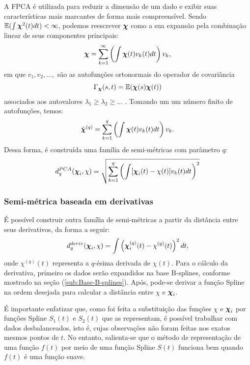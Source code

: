 \documentclass[
	12pt,				%
	openright,			%
	oneside,			%
	a4paper,			%
	english,			%
	brazil				%
	]{dissertacao-ufrgs-abntex2}
\begin{document}
A FPCA é utilizada para reduzir a dimensão de um dado e exibir suas
características mais marcantes de forma mais compreensível. Sendo
$\mathbb{E}(\int\boldsymbol{\chi}^{2}(t)dt)<\infty$, podemos reescrever $\boldsymbol{\chi}$
como a sua expansão pela combinação linear de seus componentes principais:
\begin{equation}
\boldsymbol{\chi}=\sum_{k=1}^{\text{\ensuremath{\infty}}}\left(\int\boldsymbol{\chi}(t)v_{k}(t)dt\right)v_{k},
\end{equation}
em que $v_{1},v_{2},...,$ são as autofunções ortonormais do operador de covariância
\begin{equation}
\Gamma_{\boldsymbol{\chi}}(s,t)=\mathbb{E}(\boldsymbol{\chi}(s)\boldsymbol{\chi}(t))
\end{equation}
associados aos autovalores $\lambda_{1}\geq\lambda_{2}\geq...$ .
Tomando um um número finito de autofunções, temos:
\begin{equation}
\tilde{\boldsymbol{\chi}}^{(q)}=\sum_{k=1}^{\text{\ensuremath{q}}}\left(\int\boldsymbol{\chi}(t)v_{k}(t)dt\right)v_{k}.
\end{equation}
Dessa forma, é construída uma família de semi-métricas com parâmetro
$q$:
\begin{equation}
d_{q}^{PCA}(\boldsymbol{\chi}_{i},\chi)=\sqrt{\sum_{k=1}^{\text{\ensuremath{q}}}\left(\int[\boldsymbol{\chi}_{i}(t)-\chi(t)]v_{k}(t)dt\right)^{2}}
\end{equation}



\subsubsection{Semi-métrica baseada em derivativas}

É possível construir outra família de semi-métricas a partir da distância
entre seus derivativos, da forma a seguir:
\begin{equation}
d_{q}^{deriv}(\boldsymbol{\chi}_{i},\chi)=\int\left(\boldsymbol{\chi}_{i}^{(q)}(t)-\chi^{(q)}(t)\right)^{2}dt,
\end{equation}
onde $\chi^{(q)}(t)$ representa a $q$-ésima derivada de $\chi(t)$.
Para o cálculo da derivativa, primeiro os dados serão expandidos na
base B-splines, conforme mostrado na seção (\ref{sub:Base-B-splines}).
Após, pode-se derivar a função Spline na ordem desejada para calcular
a distância entre $\chi$ e $\boldsymbol{\chi}_{i}$.

É importante enfatizar que, como foi feita a substituição das funções
$\chi$ e $\boldsymbol{\chi}_{i}$ por funções Spline $S_{1}(t)$ e $S_{2}(t)$
que as representam, é possível trabalhar com dados desbalanceados,
isto é, cujas observações não foram feitas nos exatos mesmos pontos
de $t$. No entanto, salienta-se que o método de representação de
uma função $f(t)$ por meio de uma função Spline $S(t)$ funciona
bem quando $f(t)$ é uma função suave.
\end{document}
